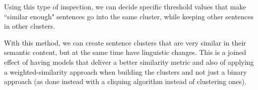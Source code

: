 Using this type of inspection, we can decide specific threshold values that make ``similar enough" sentences go into the same cluster, while keeping other sentences in other clusters.

With this method, we can create sentence clusters that are very similar in their semantic content, but at the same time have linguistic changes. This is a joined effect of having models that deliver a better similarity metric and also of applying a weighted-similarity approach when building the clusters and not just a binary approach (as done instead with a cliquing algorithm instead of clustering ones).

